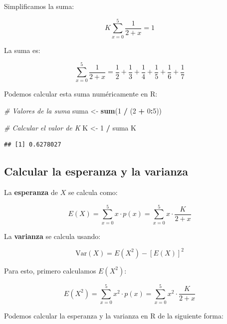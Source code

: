 \documentclass[
]{article}
\newenvironment{Shaded}{\begin{snugshade}}{\end{snugshade}}
\newcommand{\CommentTok}[1]{\textcolor[rgb]{0.56,0.35,0.01}{\textit{#1}}}
\newcommand{\DecValTok}[1]{\textcolor[rgb]{0.00,0.00,0.81}{#1}}
\newcommand{\FunctionTok}[1]{\textcolor[rgb]{0.13,0.29,0.53}{\textbf{#1}}}
\newcommand{\NormalTok}[1]{#1}
\newcommand{\OtherTok}[1]{\textcolor[rgb]{0.56,0.35,0.01}{#1}}
\newcommand{\SpecialCharTok}[1]{\textcolor[rgb]{0.81,0.36,0.00}{\textbf{#1}}}
\begin{document}
Simplificamos la suma:

\[
K \sum_{x=0}^{5} \frac{1}{2+x} = 1
\]

La suma es:

\[
\sum_{x=0}^{5} \frac{1}{2+x} = \frac{1}{2} + \frac{1}{3} + \frac{1}{4} + \frac{1}{5} + \frac{1}{6} + \frac{1}{7}
\]

Podemos calcular esta suma numéricamente en R:

\begin{Shaded}
\begin{Highlighting}[]
\CommentTok{\# Valores de la suma}
\NormalTok{suma }\OtherTok{\textless{}{-}} \FunctionTok{sum}\NormalTok{(}\DecValTok{1} \SpecialCharTok{/}\NormalTok{ (}\DecValTok{2} \SpecialCharTok{+} \DecValTok{0}\SpecialCharTok{:}\DecValTok{5}\NormalTok{))}

\CommentTok{\# Calcular el valor de K}
\NormalTok{K }\OtherTok{\textless{}{-}} \DecValTok{1} \SpecialCharTok{/}\NormalTok{ suma}
\NormalTok{K}
\end{Highlighting}
\end{Shaded}

\begin{verbatim}
## [1] 0.6278027
\end{verbatim}

\subsection{Calcular la esperanza y la varianza}\label{calcular-la-esperanza-y-la-varianza}

La \textbf{esperanza} de \(X\) se calcula como:

\[
E(X) = \sum_{x=0}^{5} x \cdot p(x) = \sum_{x=0}^{5} x \cdot \frac{K}{2+x}
\]

La \textbf{varianza} se calcula usando:

\[
\text{Var}(X) = E(X^2) - [E(X)]^2
\]

Para esto, primero calculamos \(E(X^2)\):

\[
E(X^2) = \sum_{x=0}^{5} x^2 \cdot p(x) = \sum_{x=0}^{5} x^2 \cdot \frac{K}{2+x}
\]

Podemos calcular la esperanza y la varianza en R de la siguiente forma:
\end{document}

